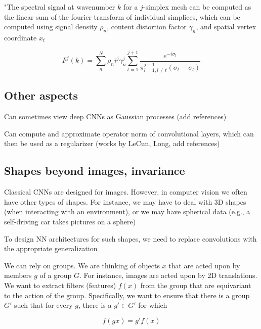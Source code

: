 \documentclass[english]{article}
\begin{document}
"The spectral signal at wavenumber $k$ for a $j$-simplex mesh can be computed as the linear sum of the fourier transform of individual simplices, which can be computed using signal density $\rho_n$, content distortion factor 
$\gamma_n$, and spatial vertex coordinate $x_t$

$$F^j(k) =
\sum^N_n
\rho_n i^j \gamma^j_n
\sum^{j+1}_{t=1}
\frac{e^{-i\sigma_t}}
{\pi^{j+1}_{l=1,l\neq t} (\sigma_t - \sigma_l)}
$$



\eitem 



\subsection{Other aspects}
\benum
\item Can sometimes view deep CNNs as Gaussian processes (add references)

\item Can compute and approximate operator norm of convolutional layers, which can then be used as a regularizer (works by LeCun, Long, add references) 

\eenum



\subsection{Shapes beyond images, invariance}
%
\bitem
\item Classical CNNs are designed for images. However, in computer vision we often have other types of shapes. For instance, we may have to deal with 3D shapes (when interacting with an environment), or we may have spherical data (e.g., a self-driving car takes pictures on a sphere)

\item To design NN architectures for such shapes, we need to replace convolutions with the appropriate generalization

\item We can rely on groups. We are thinking of objects $x$ that are acted upon by members $g$ of a group $G$. For instance, images are acted upon by 2D translations. We want to extract filters (features) $f(x)$ from the group that are equivariant to the action of the group. Specifically, we want to ensure that there is a group $G'$ such that for every $g$, there is a $g'\in G'$ for which

$$f(gx) = g'f(x)$$
\end{document}
